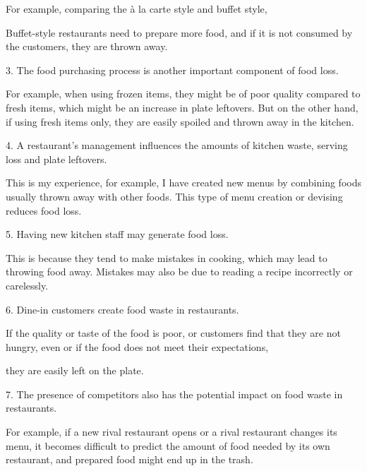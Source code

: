 \documentclass{article}
\begin{document}
\begin{multicols}{2}
\begin{spacing}{1.1}
For example, comparing the à la carte style and buffet style,

Buffet-style restaurants need to prepare more food, 
and if it is not consumed by the customers, they are thrown away.

\vspace{1em}

3. 
The food purchasing process is another important component of food loss.

For example, when using frozen items, they might be of poor quality compared to fresh items, which might be an increase in plate leftovers. 
But on the other hand, if using fresh items only, 
they are easily spoiled and thrown away in the kitchen.

\vspace{1em}

4. 
A restaurant’s management influences the amounts of kitchen waste, serving loss and plate leftovers.

This is my experience, for example,
I have created new menus by combining foods usually thrown away with other foods.
This type of menu creation or devising reduces food loss.

\vspace{1em}

5. 
Having new kitchen staff may generate food loss. 

This is because they tend to make mistakes in cooking, which may lead to throwing food away. 
Mistakes may also be due to reading a recipe incorrectly or carelessly. 

\vspace{1em}

6. 
Dine-in customers create food waste in restaurants. 

If the quality or taste of the food is poor, 
or customers find that they are not hungry, 
even or if the food does not meet their expectations, 

they are easily left on the plate.

\vspace{1em}

7. 
The presence of competitors also has the potential impact on food waste in restaurants.

For example, 
if a new rival restaurant opens or a rival restaurant changes its menu, 
it becomes difficult to predict the amount of food needed by its own restaurant, 
and prepared food might end up in the trash.

\vspace{1em}


\end{spacing}
\end{multicols}
\end{document}
